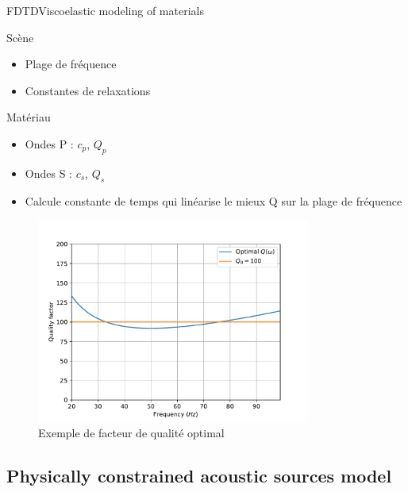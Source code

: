 \documentclass[9pt, xcolor={usenames, dvipsnames}]{beamer}
\begin{document}
				\begin{frame}{FDTD}{Viscoelastic modeling of materials}
					\begin{minipage}[t]{0.48\textwidth}
						
						
						\begin{block}{Scène}
							\begin{itemize}
								\item Plage de fréquence
								\item Constantes de relaxations
							\end{itemize}
						\end{block}
					\end{minipage}
					\hfill
					\begin{minipage}[t]{0.48\textwidth}
						\begin{block}{Matériau}
							\begin{itemize}
								\item Ondes P : $c_p$, $Q_p$
								\item Ondes S : $c_s$, $Q_s$
								\item Calcule constante de temps qui linéarise le mieux Q sur la plage de fréquence
							\end{itemize}
						\end{block}
						\begin{figure}
							\includegraphics[width=0.8\textwidth]{images/quality_factor.pdf}
							\caption{Exemple de facteur de qualité optimal}
						\end{figure}
					\end{minipage}
				\end{frame}

			\subsection{Physically constrained acoustic sources model}
\end{document}
